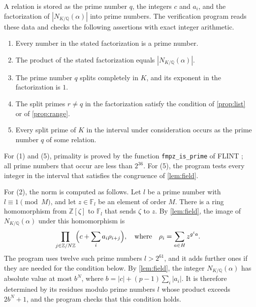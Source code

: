 \documentclass[11pt]{amsart}
\theoremstyle{plain}
\theoremstyle{definition}
\begin{document}
A relation is stored as the prime number $q$, the integers $c$ and $a_i$, and the factorization of $|N_{K/\mathbb{Q}}(\alpha)|$ into prime numbers.
The verification program reads these data and checks the following assertions with exact integer arithmetic.
\begin{enumerate}
\item Every number in the stated factorization is a prime number.
\item The product of the stated factorization equals $|N_{K/\mathbb{Q}}(\alpha)|$.
\item The prime number $q$ splits completely in $K$, and its exponent in the factorization is $1$.
\item The split primes $r \ne q$ in the factorization satisfy the condition of \cref{prop:list} or of \cref{prop:range}.
\item Every split prime of $K$ in the interval under consideration occurs as the prime number $q$ of some relation.
\end{enumerate}
For (1) and (5), primality is proved by the function \texttt{fmpz\_is\_prime} of FLINT \cite{FLINT}; all prime numbers that occur are less than $2^{36}$.
For (5), the program tests every integer in the interval that satisfies the congruence of \cref{lem:field}.

For (2), the norm is computed as follows.
Let $l$ be a prime number with $l \equiv 1 \pmod{M}$, and let $z \in \mathbb{F}_l$ be an element of order $M$.
There is a ring homomorphism from $\mathbb{Z}[\zeta]$ to $\mathbb{F}_l$ that sends $\zeta$ to $z$.
By \cref{lem:field}, the image of $N_{K/\mathbb{Q}}(\alpha)$ under this homomorphism is
\[
\prod_{j \in \mathbb{Z}/N\mathbb{Z}} \Bigl( c + \sum_i a_i \rho_{i+j} \Bigr), \quad \text{where} \quad \rho_i = \sum_{a \in H} z^{g^i a} .
\]
The program uses twelve such prime numbers $l > 2^{61}$, and it adds further ones if they are needed for the condition below.
By \cref{lem:field}, the integer $N_{K/\mathbb{Q}}(\alpha)$ has absolute value at most $b^N$, where $b = |c| + (p-1)\sum_i |a_i|$.
It is therefore determined by its residues modulo prime numbers $l$ whose product exceeds $2b^N + 1$, and the program checks that this condition holds.
\end{document}
